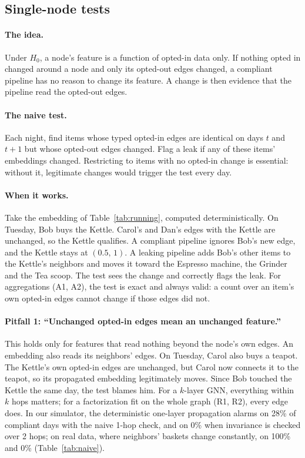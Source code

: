 \documentclass[10pt,twocolumn,letterpaper]{article}
\theoremstyle{definition}
\begin{document}
\subsection{Single-node tests}\label{sec:single}
\paragraph{The idea.}
Under $H_0$, a node's feature is a function of opted-in data only. If nothing
opted in changed around a node and only its opted-out edges changed, a
compliant pipeline has no reason to change its feature. A change is then
evidence that the pipeline read the opted-out edges.

\paragraph{The naive test.}
Each night, find items whose typed opted-in edges are identical on days $t$
and $t{+}1$ but whose opted-out edges changed. Flag a leak if any of these
items' embeddings changed. Restricting to items with no opted-in change is
essential: without it, legitimate changes would trigger the test every day.

\paragraph{When it works.}
Take the embedding of Table~\ref{tab:running}, computed deterministically.
On Tuesday, Bob buys the Kettle. Carol's and Dan's edges with the Kettle are
unchanged, so the Kettle qualifies. A compliant pipeline ignores Bob's new
edge, and the Kettle stays at $(0.5,\,1)$. A leaking pipeline adds Bob's other
items to the Kettle's neighbors and moves it toward the Espresso machine, the
Grinder and the Tea scoop. The test sees the change and correctly flags the
leak. For aggregations (A1, A2), the test is exact and always valid: a count
over an item's own opted-in edges cannot change if those edges did not.

\paragraph{Pitfall 1: ``Unchanged opted-in edges mean an unchanged feature.''}
This holds only for features that read nothing beyond the node's own edges.
An embedding also reads its neighbors' edges. On Tuesday, Carol also buys a
teapot. The Kettle's own opted-in edges are unchanged, but Carol now connects
it to the teapot, so its propagated embedding legitimately moves. Since Bob
touched the Kettle the same day, the test blames him. For a $k$-layer GNN,
everything within $k$ hops matters; for a factorization fit on the whole
graph (R1, R2), every edge does. In our simulator, the deterministic
one-layer propagation alarms on 28\% of compliant days with the naive 1-hop
check, and on 0\% when invariance is checked over 2 hops; on real data, where
neighbors' baskets change constantly, on 100\% and 0\% (Table~\ref{tab:naive}).
\end{document}
